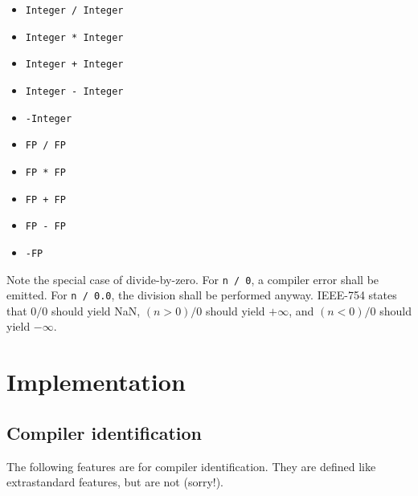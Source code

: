 \documentclass{article}
\begin{document}
\begin{itemize}
\item{\texttt{Integer / Integer}}
\item{\texttt{Integer * Integer}}
\item{\texttt{Integer + Integer}}
\item{\texttt{Integer - Integer}}
\item{\texttt{-Integer}}
\item{\texttt{FP / FP}}
\item{\texttt{FP * FP}}
\item{\texttt{FP + FP}}
\item{\texttt{FP - FP}}
\item{\texttt{-FP}}
\end{itemize}

Note the special case of divide-by-zero. For \texttt{n / 0}, a compiler error
shall be emitted. For \texttt{n / 0.0}, the division shall be performed
anyway. IEEE-754 states that $0 / 0$ should yield NaN, $(n > 0) / 0$ should
yield $+\infty$, and $(n < 0) / 0$ should yield $-\infty$.

\section{Implementation}
\label{sec:implementation}

\subsection{Compiler identification}
\label{sub:implementation:ident}
The following features are for compiler identification. They are defined
like extrastandard features, but are not (sorry!).
\end{document}
